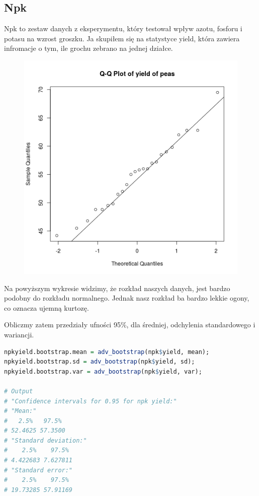 \documentclass[11pt]{article}
\begin{document}
\pagebreak

\subsection{Npk}
Npk to zestaw danych z eksperymentu, który testował wpływ azotu, fosforu i potasu
na wzrost groszku. Ja skupiłem się na statystyce yield, która zawiera infromacje
o tym, ile grochu zebrano na jednej działce.

\begin{figure}[h]
\includegraphics[scale=0.5]{npkyield_qq.png}
\centering
\end{figure}

Na powyższym wykresie widzimy, że rozkład naszych danych, jest bardzo podobny do
rozkładu normalnego. Jednak nasz rozkład ba bardzo lekkie ogony, co oznacza ujemną
kurtozę.

Obliczmy zatem przedziały ufności 95\%, dla średniej, odchylenia standardowego i wariancji.

\begin{lstlisting}[language=R]
npkyield.bootstrap.mean = adv_bootstrap(npk$yield, mean);
npkyield.bootstrap.sd = adv_bootstrap(npk$yield, sd);
npkyield.bootstrap.var = adv_bootstrap(npk$yield, var);

# Output
# "Confidence intervals for 0.95 for npk yield:"
# "Mean:"
#   2.5%   97.5% 
# 52.4625 57.3500 
# "Standard deviation:"
#    2.5%    97.5% 
# 4.422683 7.627811 
# "Standard error:"
#    2.5%    97.5% 
# 19.73285 57.91169 
\end{lstlisting}
\end{document}
